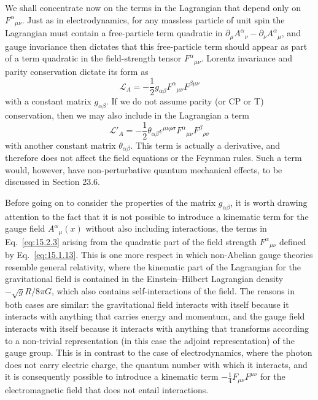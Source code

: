 We shall concentrate now on the terms in the Lagrangian that depend only on
$F^\alpha{}_{\mu\nu}$. Just as in electrodynamics, for any massless particle of
unit spin the Lagrangian must contain a free-particle term quadratic in
$\partial_\mu A^\alpha{}_\nu-\partial_\nu A^\alpha{}_\mu$, and gauge invariance
then dictates that this free-particle term should appear as part of a term
quadratic in the field-strength tensor $F^\alpha{}_{\mu\nu}$. Lorentz invariance
and parity conservation dictate its form as
\begin{equation}
 \mathcal L_A=-\frac12g_{\alpha\beta}F^\alpha{}_{\mu\nu}F^{\beta\mu\nu}
 \tag{15.2.3}\label{eq:15.2.3}
\end{equation}
with a constant matrix $g_{\alpha\beta}$. If we do not assume parity (or CP or T)
conservation, then we may also include in the Lagrangian a term
\[
 \mathcal L'_A=-\frac12\theta_{\alpha\beta}\epsilon^{\mu\nu\rho\sigma}
 F^\alpha{}_{\mu\nu}F^\beta{}_{\rho\sigma}
\]
with another constant matrix $\theta_{\alpha\beta}$. This term is actually a
derivative, and therefore does not affect the field equations or the Feynman
rules. Such a term would, however, have non-perturbative quantum mechanical
effects, to be discussed in Section 23.6.

Before going on to consider the properties of the matrix $g_{\alpha\beta}$, it is
worth drawing attention to the fact that it is not possible to introduce a
kinematic term for the gauge field $A^\alpha{}_\mu(x)$ without also including
interactions, the terms in Eq.~\eqref{eq:15.2.3} arising from the quadratic part
of the field strength $F^\alpha{}_{\mu\nu}$ defined by
Eq.~\eqref{eq:15.1.13}. This is one more respect in which non-Abelian gauge
theories resemble general relativity, where the kinematic part of the Lagrangian
for the gravitational field is contained in the Einstein--Hilbert Lagrangian
density $-\sqrt{g}R/8\pi G$, which also contains self-interactions of the field.
The reasons in both cases are similar: the gravitational field interacts with
itself because it interacts with anything that carries energy and momentum, and
the gauge field interacts with itself because it interacts with anything that
transforms according to a non-trivial representation (in this case the adjoint
representation) of the gauge group. This is in contrast to the case of
electrodynamics, where the photon does not carry electric charge, the quantum
number with which it interacts, and it is consequently possible to introduce a
kinematic term $-\frac14F_{\mu\nu}F^{\mu\nu}$ for the electromagnetic field that
does not entail interactions.

